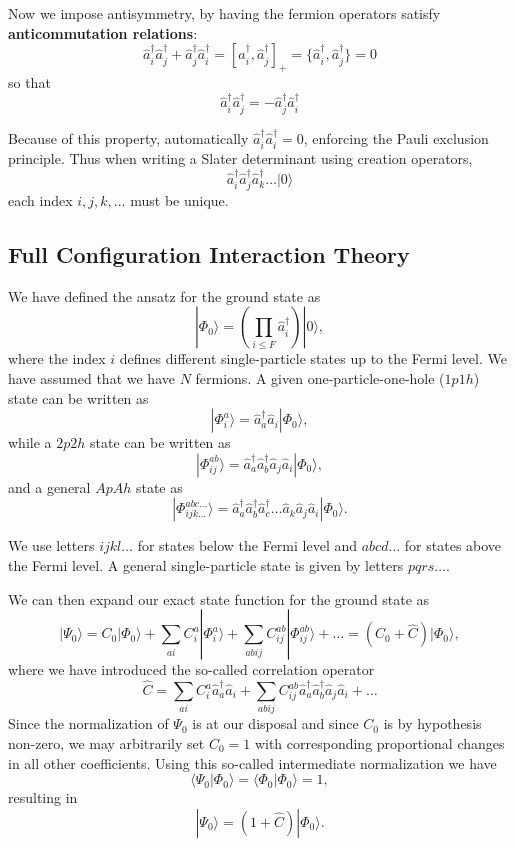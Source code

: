 Now we impose antisymmetry, by having the fermion operators satisfy  \textbf{anticommutation relations}:
\[
\hat{a}^\dagger_i \hat{a}^\dagger_j + \hat{a}^\dagger_j \hat{a}^\dagger_i
= [ \hat{a}^\dagger_i ,\hat{a}^\dagger_j ]_+ 
= \{ \hat{a}^\dagger_i ,\hat{a}^\dagger_j \} = 0
\]
so that 
\[
\hat{a}^\dagger_i \hat{a}^\dagger_j = - \hat{a}^\dagger_j \hat{a}^\dagger_i
\]




Because of this property, automatically $\hat{a}^\dagger_i \hat{a}^\dagger_i = 0$, 
enforcing the Pauli exclusion principle.  Thus when writing a Slater determinant 
using creation operators, 
\[
\hat{a}^\dagger_i \hat{a}^\dagger_j \hat{a}^\dagger_k \ldots |0 \rangle
\]
each index $i,j,k, \ldots$ must be unique.




\subsection{Full Configuration Interaction Theory}

We have defined the ansatz for the ground state as 
\[
|\Phi_0\rangle = \left(\prod_{i\le F}\hat{a}_{i}^{\dagger}\right)|0\rangle,
\]
where the index $i$ defines different single-particle states up to the Fermi level. We have assumed that we have $N$ fermions. 
A given one-particle-one-hole ($1p1h$) state can be written as
\[
|\Phi_i^a\rangle = \hat{a}_{a}^{\dagger}\hat{a}_i|\Phi_0\rangle,
\]
while a $2p2h$ state can be written as
\[
|\Phi_{ij}^{ab}\rangle = \hat{a}_{a}^{\dagger}\hat{a}_{b}^{\dagger}\hat{a}_j\hat{a}_i|\Phi_0\rangle,
\]
and a general $ApAh$ state as 
\[
|\Phi_{ijk\dots}^{abc\dots}\rangle = \hat{a}_{a}^{\dagger}\hat{a}_{b}^{\dagger}\hat{a}_{c}^{\dagger}\dots\hat{a}_k\hat{a}_j\hat{a}_i|\Phi_0\rangle.
\]

We use letters $ijkl\dots$ for states below the Fermi level and $abcd\dots$ for states above the Fermi level. A general single-particle state is given by letters $pqrs\dots$.

We can then expand our exact state function for the ground state 
as
\[
|\Psi_0\rangle=C_0|\Phi_0\rangle+\sum_{ai}C_i^a|\Phi_i^a\rangle+\sum_{abij}C_{ij}^{ab}|\Phi_{ij}^{ab}\rangle+\dots
=(C_0+\hat{C})|\Phi_0\rangle,
\]
where we have introduced the so-called correlation operator 
\[
\hat{C}=\sum_{ai}C_i^a\hat{a}_{a}^{\dagger}\hat{a}_i  +\sum_{abij}C_{ij}^{ab}\hat{a}_{a}^{\dagger}\hat{a}_{b}^{\dagger}\hat{a}_j\hat{a}_i+\dots
\]
Since the normalization of $\Psi_0$ is at our disposal and since $C_0$ is by hypothesis non-zero, we may arbitrarily set $C_0=1$ with 
corresponding proportional changes in all other coefficients. Using this so-called intermediate normalization we have
\[
\langle \Psi_0 | \Phi_0 \rangle = \langle \Phi_0 | \Phi_0 \rangle = 1, 
\]
resulting in 
\[
|\Psi_0\rangle=(1+\hat{C})|\Phi_0\rangle.
\]


